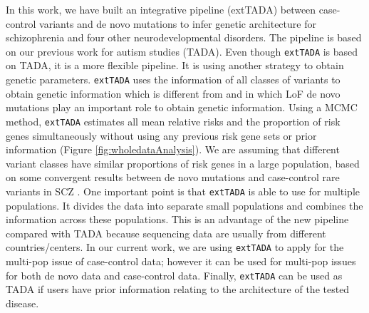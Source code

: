 \documentclass[]{article}
\begin{document}
In this work, we have built an integrative pipeline (extTADA) between
case-control variants and de novo mutations to infer genetic
architecture for schizophrenia and four other neurodevelopmental
disorders. The pipeline is based on our previous work for autism studies (TADA).
Even though \texttt{extTADA} is based on TADA, it is a more flexible pipeline.
It is using another strategy to
obtain genetic parameters. \texttt{extTADA} uses the information of
all classes of variants to obtain genetic information which is
different from \cite{he2013integrated} and  \cite{de2014synaptic} in
which LoF de novo mutations play an important role to obtain genetic
information. Using a MCMC method, \texttt{extTADA} estimates all mean
relative risks and the proportion of risk genes simultaneously without
using any previous risk gene sets or prior information (Figure
\ref{fig:wholedataAnalysis}). We are
assuming that different variant classes have similar proportions
of risk genes in a large population, based on some
convergent results between de novo mutations and case-control rare
variants in SCZ \citep{fromer2014novo, purcell2014polygenic,
  singh2016rare}. One important point is that \texttt{extTADA} is able to use for multiple populations. It divides the data into separate small populations and
combines the information across these populations. This is an
advantage of the new pipeline compared with TADA because sequencing
data are usually from different countries/centers. In our current
work, we are using \texttt{extTADA} to apply for the multi-pop issue of
case-control data; however it can be used for multi-pop issues for
both de novo data and case-control data. Finally, \texttt{extTADA} can be
used as TADA if users have prior information relating to the
architecture of the tested disease.
\end{document}
